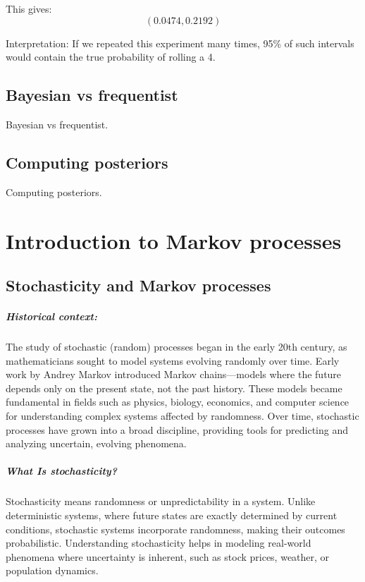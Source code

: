 \documentclass{book}
\begin{document}
This gives:
\[
(0.0474, 0.2192)
\]

Interpretation: If we repeated this experiment many times, 95\% of such intervals would contain the true probability of rolling a 4.

\newpage

\section{Bayesian vs frequentist}
Bayesian vs frequentist.

\newpage

\section{Computing posteriors}
Computing posteriors.



\chapter{Introduction to Markov processes}

\section{Stochasticity and Markov processes}

\paragraph{Historical context:}
The study of stochastic (random) processes began in the early 20th century, as mathematicians sought to model systems evolving randomly over time. Early work by Andrey Markov introduced Markov chains—models where the future depends only on the present state, not the past history. These models became fundamental in fields such as physics, biology, economics, and computer science for understanding complex systems affected by randomness. Over time, stochastic processes have grown into a broad discipline, providing tools for predicting and analyzing uncertain, evolving phenomena.

\paragraph{What Is stochasticity?}
Stochasticity means randomness or unpredictability in a system. Unlike deterministic systems, where future states are exactly determined by current conditions, stochastic systems incorporate randomness, making their outcomes probabilistic. Understanding stochasticity helps in modeling real-world phenomena where uncertainty is inherent, such as stock prices, weather, or population dynamics.
\end{document}
